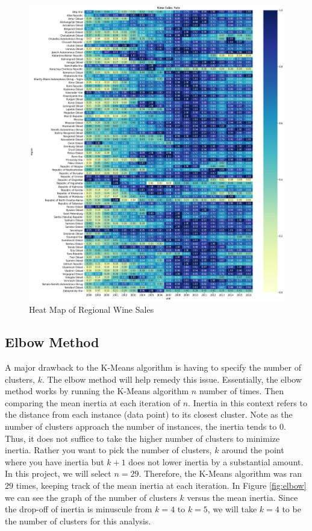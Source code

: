 \documentclass{article}
\begin{document}
\begin{figure}[!htb]
    \centering
    \includegraphics[scale = .42]{Graphs/heatmap_region.png}
    \caption{Heat Map of Regional Wine Sales}
    \label{fig:heatmap_r}
\end{figure}

\subsection{Elbow Method}
A major drawback to the K-Means algorithm is having to specify the number of clusters, $k$. The elbow method will help remedy this issue. Essentially, the elbow method works by running the K-Means algorithm $n$ number of times. Then comparing the mean inertia at each iteration of $n$. Inertia in this context refers to the distance from each instance (data point) to its closest cluster. Note as the number of clusters approach the number of instances, the inertia tends to 0. Thus, it does not suffice to take the higher number of clusters to minimize inertia. Rather you want to pick the number of clusters, $k$ around the point where you have inertia but $k+1$ does not lower inertia by a substantial amount. In this project, we will select $n = 29$. Therefore, the K-Means algorithm was ran $29$ times, keeping track of the mean inertia at each iteration. In Figure \ref{fig:elbow} we can see the graph of the number of clusters $k$ versus the mean inertia. Since the drop-off of inertia is minuscule from $k=4$ to $k=5$, we will take $k=4$ to be the number of clusters for this analysis.
\end{document}

